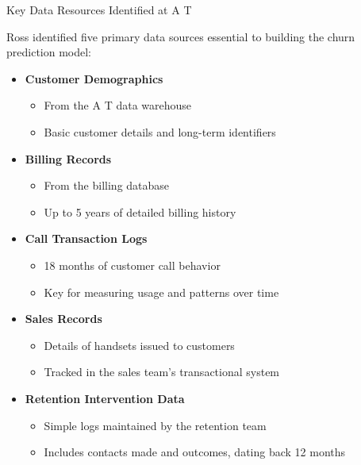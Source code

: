 \documentclass[aspectratio=169,xcolor=dvipsnames]{beamer}
\begin{document}
\begin{frame}{Key Data Resources Identified at A T}

Ross identified five primary data sources essential to building the churn prediction model:

\begin{itemize}
  \item \textbf{Customer Demographics}  
  \begin{itemize}
    \item From the A T data warehouse
    \item Basic customer details and long-term identifiers
  \end{itemize}
  
  \item \textbf{Billing Records}  
  \begin{itemize}
    \item From the billing database
    \item Up to 5 years of detailed billing history
  \end{itemize}
  
  \item \textbf{Call Transaction Logs}  
  \begin{itemize}
    \item 18 months of customer call behavior
    \item Key for measuring usage and patterns over time
  \end{itemize}
  
  \item \textbf{Sales Records}  
  \begin{itemize}
    \item Details of handsets issued to customers
    \item Tracked in the sales team's transactional system
  \end{itemize}
  
  \item \textbf{Retention Intervention Data}  
  \begin{itemize}
    \item Simple logs maintained by the retention team
    \item Includes contacts made and outcomes, dating back 12 months
  \end{itemize}
\end{itemize}

\end{frame}
\end{document}
